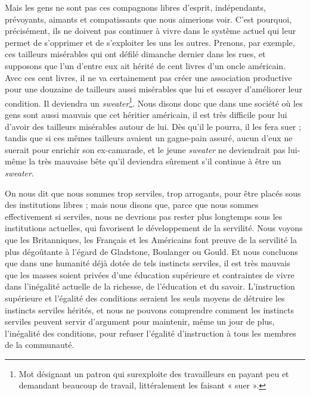 Mais les gens ne sont pas ces compagnons libres d'esprit, indépendants, prévoyants, aimants et compatissants que nous aimerions voir. C'est pourquoi, précisément, ils ne doivent pas continuer à vivre dans le système actuel qui leur permet de s'opprimer et de s'exploiter les uns les autres. Prenons, par exemple, ces tailleurs misérables qui ont défilé dimanche dernier dans les rues, et supposons que l'un d'entre eux ait hérité de cent livres d'un oncle américain. Avec ces cent livres, il ne va certainement pas créer une association productive pour une douzaine de tailleurs aussi misérables que lui et essayer d'améliorer leur condition. Il deviendra un \emph{sweater}\footnote{Mot désignant un patron qui surexploite des travailleurs en payant peu et demandant beaucoup de travail, littéralement les faisant « suer ».}. Nous disons donc que dans une société où les gens sont aussi mauvais que cet héritier américain, il est très difficile pour lui d'avoir des tailleurs misérables autour de lui. Dès qu'il le pourra, il les fera suer ; tandis que si ces mêmes tailleurs avaient un gagne-pain assuré, aucun d'eux ne suerait pour enrichir son ex-camarade, et le jeune \emph{sweater} ne deviendrait pas lui-même la très mauvaise bête qu'il deviendra sûrement s'il continue à être un \emph{sweater}.

On nous dit que nous sommes trop serviles, trop arrogants, pour être placés sous des institutions libres ; mais nous disons que, parce que nous sommes effectivement si serviles, nous ne devrions pas rester plus longtemps sous les institutions actuelles, qui favorisent le développement de la servilité. Nous voyons que les Britanniques, les Français et les Américains font preuve de la servilité la plus dégoûtante à l'égard de Gladstone, Boulanger ou Gould. Et nous concluons que dans une humanité déjà dotée de tels instincts serviles, il est très mauvais que les masses soient privées d'une éducation supérieure et contraintes de vivre dans l'inégalité actuelle de la richesse, de l'éducation et du savoir. L'instruction supérieure et l'égalité des conditions seraient les seuls moyens de détruire les instincts serviles hérités, et nous ne pouvons comprendre comment les instincts serviles peuvent servir d'argument pour maintenir, même un jour de plus, l'inégalité des conditions, pour refuser l'égalité d'instruction à tous les membres de la communauté.

